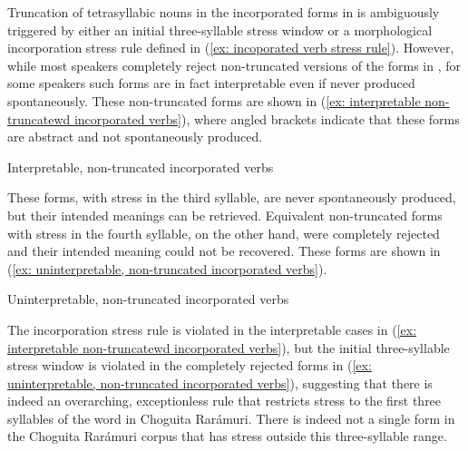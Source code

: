 Truncation of tetrasyllabic nouns in the incorporated forms in  is ambiguously triggered by either an initial three-syllable stress window or a morphological incorporation stress rule defined in (\ref{ex: incoporated verb stress rule}). However, while most speakers completely reject non-truncated versions of the forms in , for some speakers such forms are in fact interpretable even if never produced spontaneously. These non-truncated forms are shown in (\ref{ex: interpretable non-truncatewd incorporated verbs}), where angled brackets indicate that these forms are abstract and not spontaneously produced.


\ea\label{ex: interpretable non-truncatewd incorporated verbs}
{Interpretable, non-truncated incorporated verbs}

    \z
\z

These forms, with stress in the third syllable, are never spontaneously produced, but their intended meanings can be retrieved. Equivalent non-truncated forms with stress in the fourth syllable, on the other hand, were completely rejected and their intended meaning could not be recovered. These forms are shown in (\ref{ex: uninterpretable, non-truncated incorporated verbs}).

\ea\label{ex: uninterpretable, non-truncated incorporated verbs}
{Uninterpretable, non-truncated incorporated verbs}

    \z
\z

The incorporation stress rule is violated in the interpretable cases in (\ref{ex: interpretable non-truncatewd incorporated verbs}), but the initial three-syllable stress window is violated in the completely rejected forms in (\ref{ex: uninterpretable, non-truncated incorporated verbs}), suggesting that there is indeed an overarching, exceptionless rule that restricts stress to the first three syllables of the word in Choguita Rarámuri. There is indeed not a single form in the Choguita Rarámuri corpus that has stress outside this three-syllable range.

